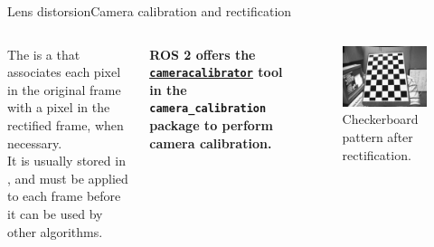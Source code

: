 \begin{frame}{Lens distorsion}{Camera calibration and rectification}
	\begin{columns}
		The  is a  that associates each pixel in the original frame with a pixel in the rectified frame,  when necessary.\\
		\bigskip
		It is usually stored in , and must be applied to each frame before it can be used by other algorithms.
		\vspace{.45cm}
		\begin{block}{}
			\centering
			\textbf{ROS 2 offers the \href{https://navigation.ros.org/tutorials/docs/camera_calibration.html}{\color{blue}\underline{\texttt{cameracalibrator}}} tool in the \texttt{camera\_calibration} package to perform camera calibration.}
		\end{block}

		\begin{figure}
			\centering
			\includegraphics[width=.9\textwidth]{calibrated}
			\caption{Checkerboard pattern after rectification.}
			\label{fig:calibrated}
		\end{figure}
	\end{columns}
\end{frame}

